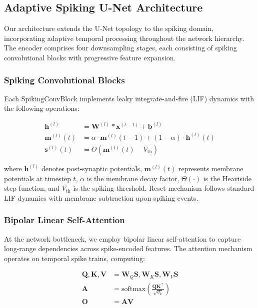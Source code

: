 \documentclass[12pt,a4paper]{article}
\begin{document}
\subsection{Adaptive Spiking U-Net Architecture}

Our architecture extends the U-Net topology to the spiking domain, incorporating adaptive temporal processing throughout the network hierarchy. The encoder comprises four downsampling stages, each consisting of spiking convolutional blocks with progressive feature expansion.

\subsubsection{Spiking Convolutional Blocks}

Each SpikingConvBlock implements leaky integrate-and-fire (LIF) dynamics with the following operations:

\begin{align}
\mathbf{h}^{(l)} &= \mathbf{W}^{(l)} * \mathbf{x}^{(l-1)} + \mathbf{b}^{(l)} \\
\mathbf{m}^{(l)}(t) &= \alpha \cdot \mathbf{m}^{(l)}(t-1) + (1-\alpha) \cdot \mathbf{h}^{(l)}(t) \\
\mathbf{s}^{(l)}(t) &= \Theta(\mathbf{m}^{(l)}(t) - V_{\text{th}})
\end{align}

where $\mathbf{h}^{(l)}$ denotes post-synaptic potentials, $\mathbf{m}^{(l)}(t)$ represents membrane potentials at timestep $t$, $\alpha$ is the membrane decay factor, $\Theta(\cdot)$ is the Heaviside step function, and $V_{\text{th}}$ is the spiking threshold. Reset mechanism follows standard LIF dynamics with membrane subtraction upon spiking events.

\subsubsection{Bipolar Linear Self-Attention}

At the network bottleneck, we employ bipolar linear self-attention to capture long-range dependencies across spike-encoded features. The attention mechanism operates on temporal spike trains, computing:

\begin{align}
\mathbf{Q}, \mathbf{K}, \mathbf{V} &= \mathbf{W}_Q \mathbf{S}, \mathbf{W}_K \mathbf{S}, \mathbf{W}_V \mathbf{S} \\
\mathbf{A} &= \text{softmax}\left(\frac{\mathbf{Q}\mathbf{K}^\top}{\sqrt{d_k}}\right) \\
\mathbf{O} &= \mathbf{A} \mathbf{V}
\end{align}
\end{document}
